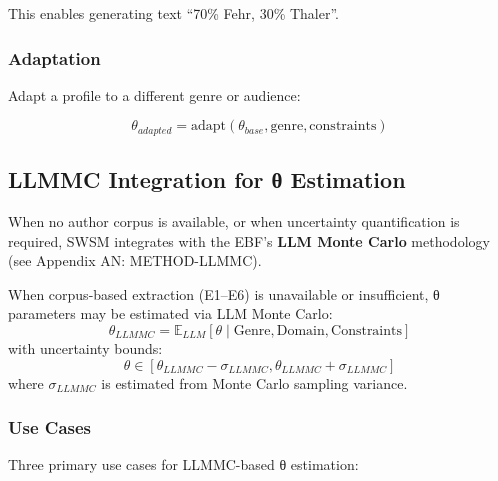 This enables generating text ``70\% Fehr, 30\% Thaler''.

\subsubsection{Adaptation}

Adapt a profile to a different genre or audience:

\begin{equation}
\theta_{adapted} = \text{adapt}(\theta_{base}, \text{genre}, \text{constraints})
\end{equation}


\subsection{LLMMC Integration for θ Estimation}
\label{sec:sw-llmmc}

When no author corpus is available, or when uncertainty quantification is required,
SWSM integrates with the EBF's \textbf{LLM Monte Carlo} methodology (see Appendix AN: METHOD-LLMMC).

\begin{axiom}
\label{ax:swsm-21}
When corpus-based extraction (E1--E6) is unavailable or insufficient, θ parameters
may be estimated via LLM Monte Carlo:
\begin{equation}
\theta_{LLMMC} = \mathbb{E}_{LLM}[\theta \mid \text{Genre}, \text{Domain}, \text{Constraints}]
\end{equation}
with uncertainty bounds:
\begin{equation}
\theta \in [\theta_{LLMMC} - \sigma_{LLMMC}, \theta_{LLMMC} + \sigma_{LLMMC}]
\end{equation}
where $\sigma_{LLMMC}$ is estimated from Monte Carlo sampling variance.
\end{axiom}

\subsubsection{Use Cases}

Three primary use cases for LLMMC-based θ estimation:

